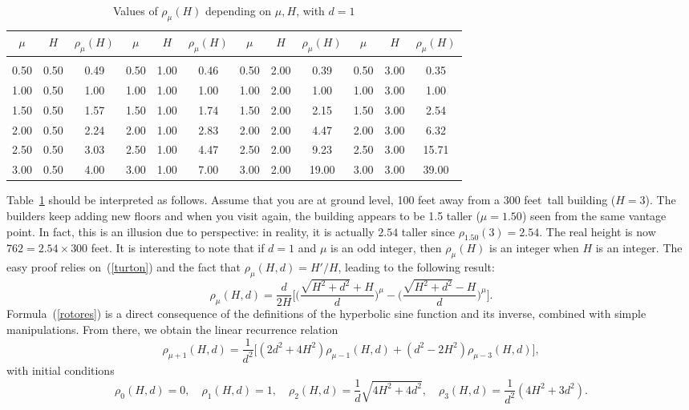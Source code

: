 \documentclass[10pt]{article}
\renewcommand{\arraystretch}{1.4} %
\begin{document}
\begin{table}[H]
\centering
\renewcommand{\arraystretch}{1.0}
\begin{tabular}{ccc|ccc|ccc|ccc} 
 \hline
 $\mu$ & $H$ & $\rho_\mu(H)$ & $\mu$ & $H$ & $\rho_\mu(H)$ &$\mu$ & $H$ & $\rho_\mu(H)$ &$\mu$ & $H$ & $\rho_\mu(H)$ \\[0.5ex] 
 \hline 
\hline 
   &  &    &  &    &  &    &  &  \\  [-2ex]
0.50&0.50&0.49&0.50&1.00&0.46&0.50&2.00&0.39&0.50&3.00&0.35\\
1.00&0.50&1.00&1.00&1.00&1.00&1.00&2.00&1.00&1.00&3.00&1.00\\
1.50&0.50&1.57&1.50&1.00&1.74&1.50&2.00&2.15&1.50&3.00&2.54\\
2.00&0.50&2.24&2.00&1.00&2.83&2.00&2.00&4.47&2.00&3.00&6.32\\
2.50&0.50&3.03&2.50&1.00&4.47&2.50&2.00&9.23&2.50&3.00&15.71\\
3.00&0.50&4.00&3.00&1.00&7.00&3.00&2.00&19.00&3.00&3.00&39.00\\

 \hline
\end{tabular}
\caption{Values of $\rho_\mu(H)$ depending on $\mu, H$, with $d=1$}
\label{table:kurdisre}
\end{table}
\noindent
Table~\ref{table:kurdisre} should be interpreted as follows. Assume that you are at ground level, 100 feet away from a 300 feet~tall building ($H=3$). The builders keep adding new floors and when you visit again, the building appears to be 1.5 taller
($\mu = 1.50$) seen from the same vantage point. In fact, this is an illusion due to perspective: in reality, it is actually $2.54$ taller since $\rho_{1.50}(3) = 2.54$. The real height is now 
$762 = 2.54 \times 300$ feet. It is interesting to note that if $d=1$ and $\mu$ is an odd integer,
then $\rho_{\mu}(H)$ is an integer when $H$ is an integer. The easy proof relies on~(\ref{turton}) and the fact that 
$\rho_{\mu}(H, d) = H'/H$, leading to the following result:
\begin{equation}
\rho_{\mu}(H,d) = \frac{d}{2H} \Bigg[
\Bigg(\frac{\sqrt{H^2 + d^2} +H}{d}\Bigg)^{\mu} 
- \Bigg(\frac{\sqrt{H^2 + d^2} - H}{d}\Bigg)^{\mu}
\Bigg]. \label{rotores}
\end{equation}
Formula~(\ref{rotores}) is a direct consequence of the definitions of the hyperbolic sine function and its inverse, combined with simple manipulations. From there, we obtain the linear recurrence relation
\begin{equation}
\rho_{\mu+1}(H, d) =\frac{1}{d^2}\Big[ (2d^2+4H^2) \rho_{\mu-1}(H, d)  +   (d^2-2H^2)  \rho_{\mu-3}(H, d)  \Big] ,
\end{equation}
with initial conditions 
$$
\rho_{0}(H, d)  = 0, \quad
\rho_{1}(H, d)  = 1, \quad
\rho_{2}(H,d)  = \frac{1}{d}\sqrt{4H^2+4d^2}, \quad
\rho_{3}(H,d)  = \frac{1}{d^2}(4H^2+3d^2). 
$$
\end{document}
